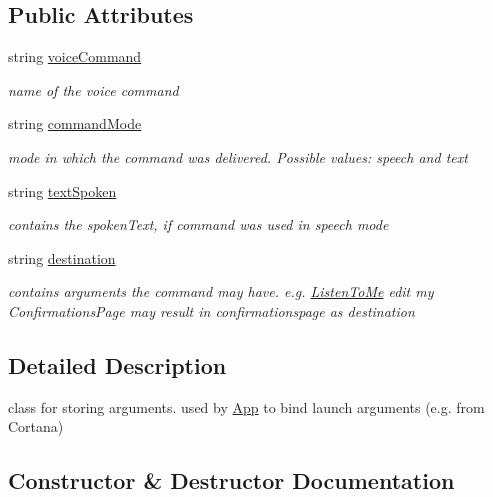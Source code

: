 \subsection*{Public Attributes}
\begin{DoxyCompactItemize}
\item 
string \hyperlink{class_listen_to_me_1_1_model_1_1_listen_to_me_voice_command_ac1ab4ff605dddd6dfe7f038e46cf522e}{voice\+Command}
\begin{DoxyCompactList}\small\item\em name of the voice command \end{DoxyCompactList}\item 
string \hyperlink{class_listen_to_me_1_1_model_1_1_listen_to_me_voice_command_a6243f032e7b44a3de833ae4362150b53}{command\+Mode}
\begin{DoxyCompactList}\small\item\em mode in which the command was delivered. Possible values\+: speech and text \end{DoxyCompactList}\item 
string \hyperlink{class_listen_to_me_1_1_model_1_1_listen_to_me_voice_command_af82e41e09f7b7888d1ce9f6a0fa9ada8}{text\+Spoken}
\begin{DoxyCompactList}\small\item\em contains the spoken\+Text, if command was used in speech mode \end{DoxyCompactList}\item 
string \hyperlink{class_listen_to_me_1_1_model_1_1_listen_to_me_voice_command_a2d2a8120188ed1a16fefbb2461ab20f2}{destination}
\begin{DoxyCompactList}\small\item\em contains arguments the command may have. e.\+g. \hyperlink{namespace_listen_to_me}{Listen\+To\+Me} edit my Confirmations\+Page may result in confirmationspage as destination \end{DoxyCompactList}\end{DoxyCompactItemize}


\subsection{Detailed Description}
class for storing arguments. used by \hyperlink{class_listen_to_me_1_1_app}{App} to bind launch arguments (e.\+g. from Cortana) 



\subsection{Constructor \& Destructor Documentation}
